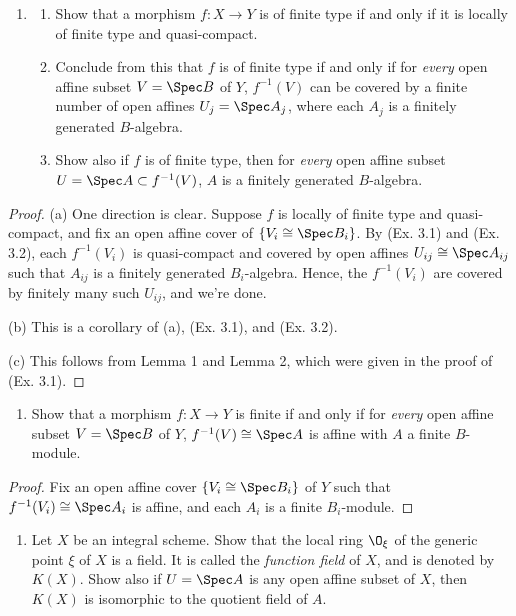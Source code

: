\documentclass[12pt]{amsart}
\begin{document}
 \begin{enumerate}
 	\item[3.3.] {
       \begin{enumerate}
         \item Show that a morphism $f:X\to Y$ is of finite type if and only if it is locally of finite type and quasi-compact.
         \item Conclude from this that $f$ is of finite type if and only if for \emph{every} open affine subset $V=\Spec B$ of $Y$, $f^{-1}(V)$ can be covered by a finite number of open affines $U_j=\Spec A_j$, where each $A_j$ is a finitely generated $B$-algebra.
         \item Show also if $f$ is of finite type, then for \emph{every} open affine subset $U=\Spec A\subset f^{-1}(V)$, $A$ is a finitely generated $B$-algebra.
       \end{enumerate}
     }
 \end{enumerate}

 \begin{proof}
   (a) One direction is clear.
   Suppose $f$ is locally of finite type and quasi-compact, and fix an open affine cover of $\{V_i\cong \Spec B_i\}$.
   By (Ex. 3.1) and (Ex. 3.2), each $f^{-1}(V_i)$ is quasi-compact and covered by open affines $U_{ij}\cong \Spec A_{ij}$ such that $A_{ij}$ is a finitely generated $B_i$-algebra.
   Hence, the $f^{-1}(V_i)$ are covered by finitely many such $U_{ij}$, and we're done.

   (b) This is a corollary of (a), (Ex. 3.1), and (Ex. 3.2).

   (c) This follows from Lemma 1 and Lemma 2, which were given in the proof of (Ex. 3.1).
 \end{proof}
 
 \begin{enumerate}
   \item[3.4.] {
       Show that a morphism $f:X\to Y$ is finite if and only if for \emph{every} open affine subset $V=\Spec B$ of $Y$, $f^{-1}(V)\cong \Spec A$ is affine with $A$ a finite $B$-module.
     }
 \end{enumerate}
 
 \begin{proof}
   Fix an open affine cover $\{V_i\cong \Spec B_i\}$ of $Y$ such that $f^{-1}(V_i)\cong \Spec A_i$ is affine, and each $A_i$ is a finite $B_i$-module.
 \end{proof}
 
 \begin{enumerate}
   \item[3.6.] {
       Let $X$ be an integral scheme.
       Show that the local ring $\O_\xi$ of the generic point $\xi$ of $X$ is a field.
       It is called the \emph{function field} of $X$, and is denoted by $K(X)$.
       Show also if $U=\Spec A$ is any open affine subset of $X$, then $K(X)$ is isomorphic to the quotient field of $A$.
     }
 \end{enumerate}
 
\end{document}
